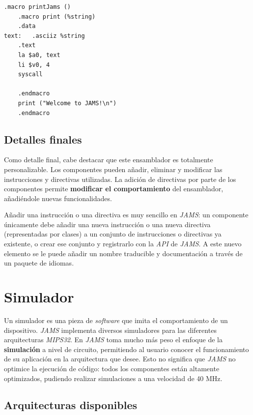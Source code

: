 \begin{lstlisting}[frame=single,label={lst:nested-macro}]
    .macro printJams ()
    .macro print (%string)
    .data
text:   .asciiz %string
    .text
    la $a0, text
    li $v0, 4
    syscall

    .endmacro
    print ("Welcome to JAMS!\n")
    .endmacro
\end{lstlisting}

\subsection{Detalles finales}\label{subsec:detalles-finales}

Como detalle final, cabe destacar que este ensamblador es totalmente personalizable.
Los componentes pueden añadir, eliminar y modificar las instrucciones y directivas
utilizadas.
La adición de directivas por parte de los componentes permite
\textbf{modificar el comportamiento} del ensamblador, añadiéndole
nuevas funcionalidades.

Añadir una instrucción o una directiva es muy sencillo en \textit{JAMS}:
un componente únicamente debe añadir una nueva instrucción o
una nueva directiva (representadas por clases) a un conjunto de
instrucciones o directivas ya existente, o crear ese conjunto y registrarlo
con la \textit{API} de \textit{JAMS}.
A este nuevo elemento se le puede añadir un nombre traducible y documentación
a través de un paquete de idiomas.

\section{Simulador}\label{sec:simulador}

Un simulador es una pieza de \textit{software} que imita el comportamiento
de un dispositivo.
\textit{JAMS} implementa diversos simuladores para las diferentes
arquitecturas \textit{MIPS32}.
En \textit{JAMS} toma mucho más peso el enfoque de la
\textbf{simulación} a nivel de circuito, permitiendo al usuario
conocer el funcionamiento de su aplicación en la arquitectura que desee.
Esto no significa que \textit{JAMS} no optimice la ejecución de código:
todos los componentes están altamente optimizados, pudiendo
realizar simulaciones a una velocidad de 40 MHz.

\subsection{Arquitecturas disponibles}\label{subsec:arquitecturas-disponibles}

